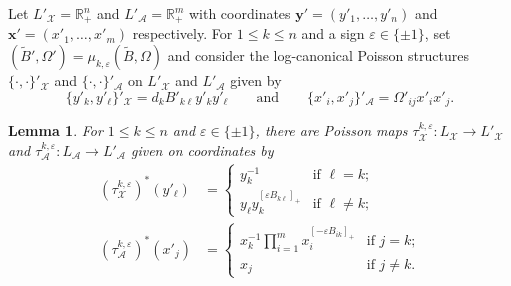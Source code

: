 \documentclass{amsart}
\newtheorem{lemma}[theorem]{Lemma}
\numberwithin{equation}{section}
\newcommand{\bfx}{\mathbf{x}}
\newcommand{\bfy}{\mathbf{y}}
\newcommand{\cA}{\mathcal{A}}
\newcommand{\cX}{\mathcal{X}}
\newcommand{\RR}{\mathbb{R}}
\begin{document}
Let $L'_\cX=\RR_+^n$ and $L'_\cA=\RR_+^m$ with coordinates $\bfy'=(y'_1,\ldots,y'_n)$ and $\bfx'=(x'_1,\ldots,x'_m)$ respectively.
For $1\le k\le n$ and a sign $\varepsilon\in\{\pm1\}$, set $(\tilde B',\Omega')=\mu_{k,\varepsilon}(\tilde B,\Omega)$ and consider the log-canonical Poisson structures $\{\cdot,\cdot\}'_\cX$ and $\{\cdot,\cdot\}'_\cA$ on $L'_\cX$ and $L'_\cA$ given by
\begin{equation}
  \label{eq:brackets}
  \{y'_k,y'_\ell\}'_\cX=d_kB'_{k\ell}y'_ky'_\ell\qquad\text{and}\qquad\{x'_i,x'_j\}'_\cA=\Omega'_{ij}x'_ix'_j.
\end{equation}
\begin{lemma}
  \label{le:tropical cluster transformations}
  For $1\le k\le n$ and $\varepsilon\in\{\pm1\}$, there are Poisson maps $\tau_\cX^{k,\varepsilon}:L_\cX\to L'_\cX$ and $\tau_\cA^{k,\varepsilon}:L_\cA\to L'_\cA$ given on coordinates by
  \begin{align}
    \label{eq:tropical X transformation}
    (\tau_\cX^{k,\varepsilon})^*(y'_\ell)
    &=\begin{cases} 
      y_k^{-1} & \text{if $\ell=k$;}\\ 
      y_\ell y_k^{[\varepsilon B_{k\ell}]_+} & \text{if $\ell\ne k$;}
    \end{cases}\\
    \label{eq:tropical A transformation}
    (\tau_\cA^{k,\varepsilon})^*(x'_j)
    &=\begin{cases} 
      x_k^{-1}\prod\limits_{i=1}^m x_i^{[-\varepsilon B_{ik}]_+} & \text{if $j=k$;}\\
      x_j & \text{if $j\ne k$.}
    \end{cases}
  \end{align}
\end{lemma}
\end{document}
